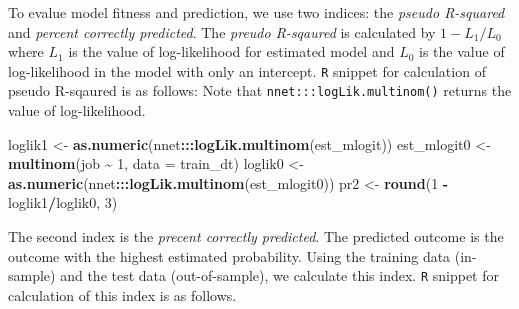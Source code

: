 \documentclass[
  12pt,
]{article}
\newenvironment{Shaded}{\begin{snugshade}}{\end{snugshade}}
\newcommand{\DataTypeTok}[1]{\textcolor[rgb]{0.13,0.29,0.53}{#1}}
\newcommand{\DecValTok}[1]{\textcolor[rgb]{0.00,0.00,0.81}{#1}}
\newcommand{\KeywordTok}[1]{\textcolor[rgb]{0.13,0.29,0.53}{\textbf{#1}}}
\newcommand{\NormalTok}[1]{#1}
\newcommand{\OperatorTok}[1]{\textcolor[rgb]{0.81,0.36,0.00}{\textbf{#1}}}
\newcommand{\StringTok}[1]{\textcolor[rgb]{0.31,0.60,0.02}{#1}}
\begin{document}
To evalue model fitness and prediction,
we use two indices: the \emph{pseudo R-squared} and \emph{percent correctly predicted}.
The \emph{preudo R-sqaured} is calculated by \(1 - L_1/L_0\) where
\(L_1\) is the value of log-likelihood for estimated model
and \(L_0\) is the value of log-likelihood in the model with only an intercept.
\texttt{R} snippet for calculation of pseudo R-sqaured is as follows:
Note that \texttt{nnet:::logLik.multinom()} returns the value of log-likelihood.

\begin{Shaded}
\begin{Highlighting}[]
\NormalTok{loglik1 \textless{}{-}}\StringTok{ }\KeywordTok{as.numeric}\NormalTok{(nnet}\OperatorTok{:::}\KeywordTok{logLik.multinom}\NormalTok{(est\_mlogit))}
\NormalTok{est\_mlogit0 \textless{}{-}}\StringTok{ }\KeywordTok{multinom}\NormalTok{(job }\OperatorTok{\textasciitilde{}}\StringTok{ }\DecValTok{1}\NormalTok{, }\DataTypeTok{data =}\NormalTok{ train\_dt)}
\NormalTok{loglik0 \textless{}{-}}\StringTok{ }\KeywordTok{as.numeric}\NormalTok{(nnet}\OperatorTok{:::}\KeywordTok{logLik.multinom}\NormalTok{(est\_mlogit0))}
\NormalTok{pr2 \textless{}{-}}\StringTok{ }\KeywordTok{round}\NormalTok{(}\DecValTok{1} \OperatorTok{{-}}\StringTok{ }\NormalTok{loglik1}\OperatorTok{/}\NormalTok{loglik0, }\DecValTok{3}\NormalTok{)}
\end{Highlighting}
\end{Shaded}

The second index is the \emph{precent correctly predicted}.
The predicted outcome is the outcome with the highest estimated probability.
Using the training data (in-sample) and the test data (out-of-sample),
we calculate this index.
\texttt{R} snippet for calculation of this index is as follows.
\end{document}
